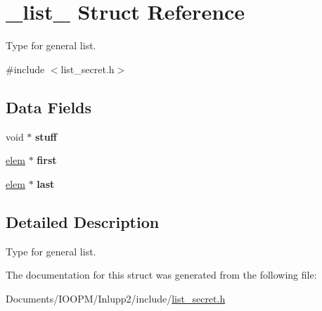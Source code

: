 \hypertarget{struct__list__}{}\section{\+\_\+list\+\_\+ Struct Reference}
\label{struct__list__}


Type for general list.  




{\ttfamily \#include $<$list\+\_\+secret.\+h$>$}

\subsection*{Data Fields}
\begin{DoxyCompactItemize}
\item 
\hypertarget{struct__list___ae3352c2d55b94520c851ad35313ea469}{}void $\ast$ {\bfseries stuff}\label{struct__list___ae3352c2d55b94520c851ad35313ea469}

\item 
\hypertarget{struct__list___a435fcd78a80fab4a2468d355cf37acc4}{}\hyperlink{struct__elem__}{elem} $\ast$ {\bfseries first}\label{struct__list___a435fcd78a80fab4a2468d355cf37acc4}

\item 
\hypertarget{struct__list___acfb162885f2bbfae56c8954c5119e1ac}{}\hyperlink{struct__elem__}{elem} $\ast$ {\bfseries last}\label{struct__list___acfb162885f2bbfae56c8954c5119e1ac}

\end{DoxyCompactItemize}


\subsection{Detailed Description}
Type for general list. 

The documentation for this struct was generated from the following file\+:\begin{DoxyCompactItemize}
\item 
Documents/\+I\+O\+O\+P\+M/\+Inlupp2/include/\hyperlink{list__secret_8h}{list\+\_\+secret.\+h}\end{DoxyCompactItemize}
